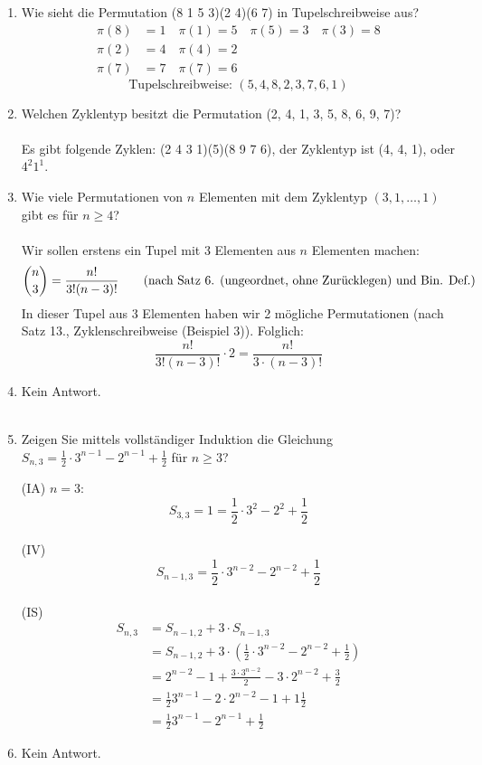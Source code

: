 \begin{enumerate}[label=(\alph*)]
        \item Wie sieht die Permutation (8 1 5 3)(2 4)(6 7) in Tupelschreibweise aus?
        \begin{align*}
        	\pi(8) &=1 \quad \pi(1)= 5 \quad \pi(5)=3 \quad \pi(3)=8\\
        	\pi(2) &=4 \quad \pi(4)=2\\
        	\pi(7) &=7 \quad \pi(7)=6
        \end{align*}
        \[\textrm{Tupelschreibweise: } (5,4,8,2,3,7,6,1)\]
        
        \item Welchen Zyklentyp besitzt die Permutation (2, 4, 1, 3, 5, 8, 6, 9, 7)?\\\\
        Es gibt folgende Zyklen: (2 4 3 1)(5)(8 9 7 6), der Zyklentyp ist (4, 4, 1), oder $4^2 1^1$.
        \item Wie viele Permutationen von $n$ Elementen mit dem Zyklentyp 
        $(3, 1, \ldots, 1)$ gibt es für $n \geq 4$?\\\\
        Wir sollen erstens ein Tupel mit 3 Elementen aus $n$ Elementen machen: 
        \[
        \binom{n}{3} = \frac{n!}{3!(n-3)!} 
        \textrm{\qquad(nach Satz 6. (ungeordnet, ohne Zur\"ucklegen) und Bin. Def.)}
        \]
        In dieser Tupel aus 3 Elementen haben wir 2 m\"ogliche Permutationen 
        (nach Satz 13., Zyklenschreibweise (Beispiel 3)). Folglich:
        \[\frac{n!}{3!(n-3)!} \cdot 2 = \frac{n!}{3\cdot(n-3)!}\]

        \item Kein Antwort.\\\\
        \item Zeigen Sie mittels vollständiger Induktion die Gleichung $S_{n,3} = \frac{1}{2} \cdot 3^{n-1} - 2^{n-1} + \frac{1}{2}$ für $n \ge 3$?\par
		(IA) $n=3:$ \[ S_{3,3} = 1 = \frac{1}{2} \cdot 3^{2} - 2^{2} + \frac{1}{2}\] \\
		(IV) \[S_{n-1,3} = \frac{1}{2} \cdot 3^{n-2} - 2^{n-2} + \frac{1}{2} \] \\
		(IS)             \begin{align*}
			S_{n,3} &= S_{n-1,2} + 3 \cdot S_{n-1,3} \tag{nach Theorem 1.15}\\
		            &= S_{n-1,2} + 3 \cdot (\frac{1}{2} \cdot 3^{n-2} - 2^{n-2} + \frac{1}{2} )  \tag{nach IV}\\
		            &= 2^{n-2} - 1 + \frac{3 \cdot 3^{n-2}}{2} -3 \cdot 2^{n-2} + \frac{3}{2} \tag{nach Aufgabe i}\\
		            &= \frac{1}{2} 3^{n-1} - 2 \cdot 2^{n-2} -1 + 1\frac{1}{2} \\
		            &= \frac{1}{2} 3^{n-1} - 2^{n-1} + \frac{1}{2} 
		            		        	  \end{align*}
        \item Kein Antwort.\\\\


\end{enumerate}
